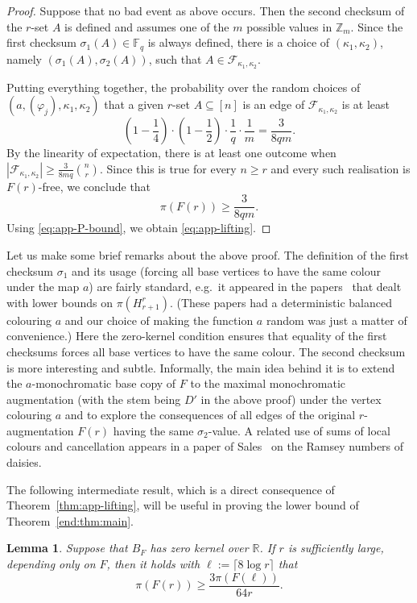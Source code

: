 \documentclass[10pt,a4paper]{article}
\numberwithin{equation}{section}
\newtheorem{lemma}[theorem]{Lemma}
\theoremstyle{definition}
\theoremstyle{remark}
\newcommand{\Z}[1]{\mathbb Z_{#1}}
\newcommand{\CSOne}{\sigma_1}
\newcommand{\CSTwo}{\sigma_2}
\newcommand{\F}[2]{\mathcal F_{#1,#2}}
\newcommand{\PP}{m}
\begin{document}
\begin{proof}
Suppose that no bad event as above occurs. Then the second checksum of the $r$-set $A$ is defined and assumes one of the $\PP$ possible values in $\Z{\PP}$. Since the first checksum $\CSOne(A)\in\mathbb F_q$ is always defined, there is a choice of $(\kappa_1,\kappa_2)$, namely $(\CSOne(A),\CSTwo(A))$, such that $A\in\F{\kappa_1}{\kappa_2}$.

Putting everything together, the probability over the random choices of $(a,(\varphi_j),\kappa_1,\kappa_2)$ that a given $r$-set $A\subseteq [n]$ is an edge of $\F{\kappa_1}{\kappa_2}$ is at least
\begin{equation*}
	\left(1-\frac14\right)\cdot\left(1-\frac1{2}\right)\cdot \frac1q\cdot \frac1{\PP}
 =\frac3{8q\PP}.
\end{equation*}
 By the linearity of expectation, there is at least one outcome when $|\F{\kappa_1}{\kappa_2}|\ge \frac3{8\PP q} \binom{n}{r}$. 
 Since this is true for every $n\ge r$ and every such realisation is $F(r)$-free, we conclude that
\[
 \pi(F(r))\ge\frac3{8q\PP}.
\]
Using \eqref{eq:app-P-bound}, we obtain \eqref{eq:app-lifting}.
\end{proof}


Let us make some brief remarks about the above proof.
The definition  of the first checksum $\CSOne$ and its usage (forcing all base vertices to have the same colour under the map $a$) are fairly standard, e.g.\ it appeared in the papers~\cite{KimRoush83,FranklRodl85gc,Sidorenko97} that dealt with lower bounds on $\pi(H_{r+1}^r)$. (These papers had a deterministic balanced colouring $a$ and our choice of making the function $a$ random was just a matter of convenience.) Here the zero-kernel condition ensures that equality of the first checksums forces all base vertices to have the same colour. 
The second checksum is more interesting and subtle. Informally, the main idea behind it is to extend the $a$-monochromatic base copy of $F$ to the maximal monochromatic augmentation (with the stem being $D'$ in the above proof) under the vertex colouring $a$ and to explore the consequences of all edges of the original $r$-augmentation $F(r)$ having the same $\CSTwo$-value. A related use of sums of local colours and cancellation appears in a paper of Sales~\cite{Sales24} on the Ramsey numbers of daisies.

The following intermediate result, which is a direct consequence of Theorem~\ref{thm:app-lifting}, will be useful in proving the  lower bound of Theorem~\ref{end:thm:main}.


\begin{lemma}\label{lem:app-one-step}
Suppose that $B_F$ has zero kernel over $\mathbb R$. If $r$ is sufficiently large, depending only on $F$, then it holds with $\ell:=\lceil8\log r\rceil$ that
\begin{equation}\label{eq:app-one-step}
 \pi(F(r))\ge\frac{3\pi(F(\ell))}{64r}.
\end{equation}
\end{lemma}
\end{document}
